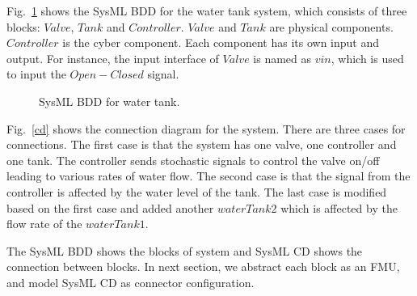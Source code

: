 Fig.~\ref{myad} shows the SysML BDD for the water tank system, which consists of three blocks: $Valve$, $Tank$ and $Controller$. $Valve$ and $Tank$ are physical components. $Controller$ is the cyber component. Each component has its own input and output. For instance, the input interface of $Valve$ is named as $vin$, which is used to input the $Open-Closed$ signal. 
\begin{figure}[htbp]
	\caption{SysML BDD for water tank.}
	\label{myad}
\end{figure}

Fig.~\ref{cd} shows the connection diagram for the system. There are three cases for connections. The first case is that the system has one valve, one controller and one tank. The controller sends stochastic signals to control the valve on/off leading to various rates of water flow. The second case is that the signal from the controller is affected by the water level of the tank. The last case is modified based on the first case and added another $waterTank2$ which is affected by the flow rate of the $waterTank1$.

\begin{figure}[htbp]
\end{figure}
The SysML BDD shows the blocks of system and SysML CD shows the connection between blocks. In next section, we abstract each block as an FMU, and model SysML CD as connector configuration.

